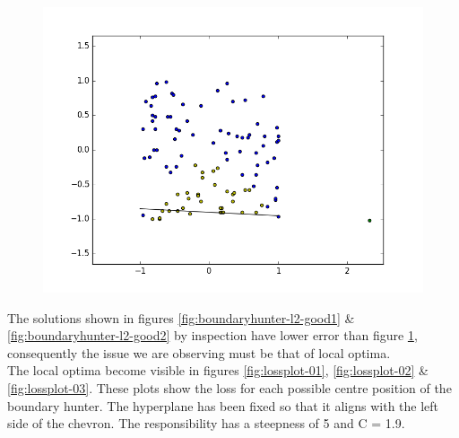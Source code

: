\documentclass[notitlepage]{report}
\theoremstyle{definition}
\begin{document}
\begin{figure}[H]
  \centering
  \begin{minipage}[b]{0.5\textwidth}
    \includegraphics[width=\textwidth]{BoundaryHunter-Attempt3-R2.png}
    \caption{}
    \label{fig:boundaryhunter-l2-badresults}
  \end{minipage}
  \hfill
\end{figure}

The solutions shown in figures \ref{fig:boundaryhunter-l2-good1} \& \ref{fig:boundaryhunter-l2-good2} by inspection have lower error than figure \ref{fig:boundaryhunter-l2-badresults}, consequently the issue we are observing must be that of local optima.\\

The local optima become visible in figures \ref{fig:lossplot-01}, \ref{fig:lossplot-02} \& \ref{fig:lossplot-03}. These plots show the loss for each possible centre position of the boundary hunter. The hyperplane has been fixed so that it aligns with the left side of the chevron. The responsibility has a steepness of 5 and C = 1.9.
\end{document}
